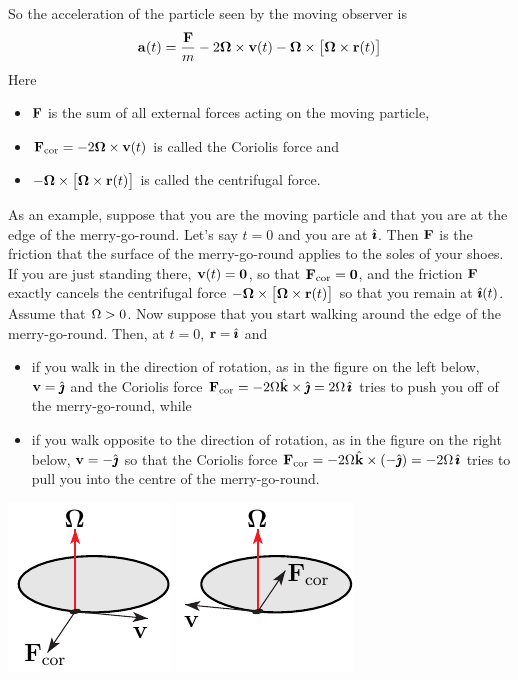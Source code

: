 So the acceleration of the particle seen by the moving observer is
\begin{align*}
\mathbf{a}(t) = \frac{\mathbf{F}}{m} -  2\mathbf{\Omega}\times\mathbf{v}(t)      
                     - \mathbf{\Omega}\times\big[\mathbf{\Omega}\times\mathbf{r}(t)\big]
\end{align*}
Here 
\begin{itemize}\itemsep1pt \parskip0pt 
\item 
   $\mathbf{F}$ is the sum of all external forces acting on the moving particle, 
\item 
   $\mathbf{F}_{{\rm cor}}=-2 \mathbf{\Omega}\times\mathbf{v}(t)$ is called the Coriolis force and
\item
   $ - \mathbf{\Omega}\times\big[\mathbf{\Omega}\times\mathbf{r}(t)\big]$ is called the centrifugal force.
\end{itemize}
As an example, suppose that you are the moving particle and that
you are at the edge of the merry-go-round. Let's say $t=0$ and you are
at $\hat{\pmb{\imath}}$. Then $\mathbf{F}$ is the friction that the surface of the merry-go-round 
applies to the soles of your shoes. If you are just standing there, 
$\mathbf{v}(t)=\mathbf{0}$, so that $\mathbf{F}_{{\rm cor}}=\mathbf{0}$, and the friction 
$\mathbf{F}$ exactly cancels the centrifugal force 
$-\mathbf{\Omega}\times\big[\mathbf{\Omega}\times\mathbf{r}(t)\big]$ 
so that you remain at $\hat{\pmb{\imath}}(t)$. Assume that $\Omega>0$. Now suppose that 
you start walking around the edge of the merry-go-round. Then, 
at $t=0$, $\mathbf{r}=\hat{\pmb{\imath}}$ and
\begin{itemize}\itemsep1pt \parskip0pt 
\item 
   if you walk in the direction of rotation, as in the figure on the 
   left below, $\mathbf{v}=\hat{\pmb{\jmath}}$ and the Coriolis force $\mathbf{F}_{{\rm cor}}=
   -2\Omega\hat{\mathbf{k}}\times\hat{\pmb{\jmath}} = 2\Omega\,\hat{\pmb{\imath}}$ tries to push you off of 
   the merry-go-round, while
\item 
   if you walk opposite to the direction of rotation, as in the figure 
   on the right below,  $\mathbf{v}=-\hat{\pmb{\jmath}}$ so that the Coriolis force 
   $\mathbf{F}_{{\rm cor}}=-2\Omega\hat{\mathbf{k}}\times(-\hat{\pmb{\jmath}}) = -2\Omega\,\hat{\pmb{\imath}}$ tries to pull you
   into the centre of the merry-go-round.
\end{itemize}
      \begin{efig} 
      \begin{center}
      \includegraphics{merryD.pdf}\qquad\qquad
      \includegraphics{merryE.pdf}
      \end{center}
      \end{efig}
